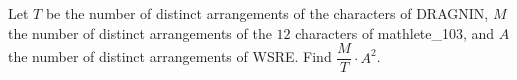 Let $T$ be the number of distinct arrangements of the characters of DRAGNIN, $M$ the number of distinct arrangements of the $12$ characters of mathlete\_103, and $A$ the number of distinct arrangements of WSRE. Find $\dfrac MT\cdot A^2$.

